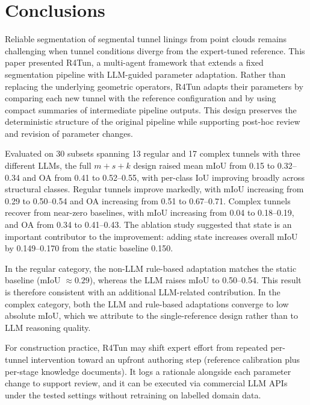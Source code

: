 \documentclass[a4paper,fleqn]{cas-dc}
\begin{document}
{%
\section{Conclusions}\label{sec:conclusions}

Reliable segmentation of segmental tunnel linings from point clouds remains challenging when tunnel conditions diverge from the expert-tuned reference. This paper presented R4Tun, a multi-agent framework that extends a fixed segmentation pipeline with LLM-guided parameter adaptation. Rather than replacing the underlying geometric operators, R4Tun adapts their parameters by comparing each new tunnel with the reference configuration and by using compact summaries of intermediate pipeline outputs. This design preserves the deterministic structure of the original pipeline while supporting post-hoc review and revision of parameter changes.

Evaluated on 30 subsets spanning 13 regular and 17 complex tunnels with three different LLMs, the full \mbox{$m+s+k$} design raised mean mIoU from 0.15 to 0.32--0.34 and OA from 0.41 to 0.52--0.55, with per-class IoU improving broadly across structural classes. Regular tunnels improve markedly, with mIoU increasing from 0.29 to 0.50--0.54 and OA increasing from 0.51 to 0.67--0.71. Complex tunnels recover from near-zero baselines, with mIoU increasing from 0.04 to 0.18--0.19, and OA from 0.34 to 0.41--0.43. The ablation study suggested that state is an important contributor to the improvement: adding state increases overall mIoU by 0.149--0.170 from the static baseline 0.150.

In the regular category, the non-LLM rule-based adaptation matches the static baseline (mIoU $\approx 0.29$), whereas the LLM raises mIoU to 0.50--0.54. This result is therefore consistent with an additional LLM-related contribution. In the complex category, both the LLM and rule-based adaptations converge to low absolute mIoU, which we attribute to the single-reference design rather than to LLM reasoning quality.

For construction practice, R4Tun may shift expert effort from repeated per-tunnel intervention toward an upfront authoring step (reference calibration plus per-stage knowledge documents). It logs a rationale alongside each parameter change to support review, and it can be executed via commercial LLM APIs under the tested settings without retraining on labelled domain data.

}
\end{document}
